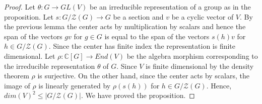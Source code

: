 \documentclass[12pt, reqno]{amsart}
\newtheorem{theorem}{Theorem}[section]
\newcommand{\C}{ {\mathbb C} }
\begin{document}
\begin{proof}
Let $\theta : G \to GL(V)$ be an irreducible representation of a group as in the proposition. Let $s : G/\mathcal{Z}(G) \to  G$ be a section and $v$ be a cyclic vector of $V$. By the previous lemma the center acts by multiplication by scalars and hence the span of the vectors $gv$ for $g\in G$ is equal to the span of the vectors $s(h)v$ for $h\in G/\mathcal{Z}(G)$. Since the center has finite index the representation is finite dimensional. Let $\rho : \C[G] \to End(V)$ be the algebra morphism corresponding to the irreducible representation $\theta$ of $G$. Since $V$ is finite dimensional by the density theorem $\rho$ is surjective. On the other hand, since the center acts by scalars, the image of $\rho$ is linearly generated by $\rho(s(h))$ for $h\in G/\mathcal{Z}(G)$. Hence, $dim(V)^2 \leq \vert G/ \mathcal{Z}(G)\vert $. We have proved the proposition. 
\end{proof}
\end{document}
